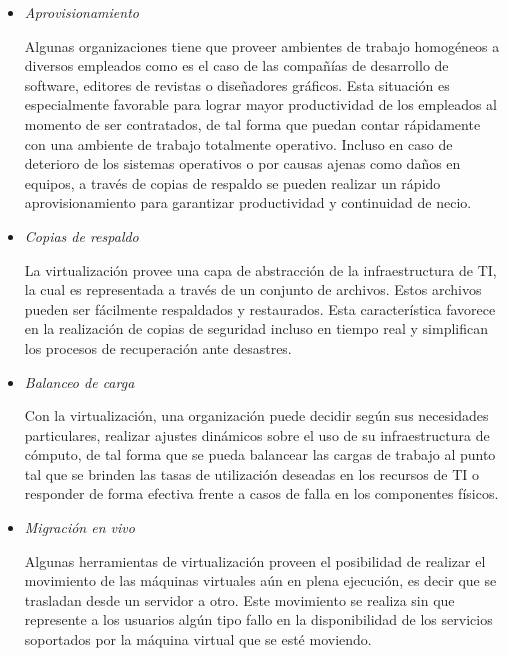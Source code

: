 \begin{itemize}
\begin{itemize}
		\item \textit{Aprovisionamiento}\vspace{3mm}
		
		Algunas organizaciones tiene que proveer ambientes de trabajo homogéneos a diversos empleados como es el caso de las compañías de desarrollo de software, editores de revistas o diseñadores gráficos. Esta situación es especialmente favorable para lograr mayor productividad de los empleados al momento de ser contratados, de tal forma que puedan contar rápidamente con una ambiente de trabajo totalmente operativo. Incluso en caso de deterioro de los sistemas operativos o por causas ajenas como daños en equipos, a través de copias de respaldo se pueden realizar un rápido aprovisionamiento para garantizar productividad y continuidad de necio.\\  
		
		\item \textit{Copias de respaldo}\vspace{3mm}
		
		La virtualización provee una capa de abstracción de la infraestructura de TI, la cual es representada a través de un conjunto de  archivos. Estos archivos pueden ser fácilmente respaldados y restaurados. Esta característica favorece en la realización de copias de seguridad incluso en tiempo real y simplifican los procesos de recuperación ante desastres.\\
		
		\item \textit{Balanceo de carga}\vspace{3mm}
		
		Con la virtualización, una organización puede decidir según sus necesidades particulares, realizar ajustes dinámicos sobre el uso de su infraestructura de cómputo, de tal forma que se pueda balancear las cargas de trabajo al punto tal que se brinden las tasas de utilización deseadas en los recursos de TI o responder de forma efectiva frente a casos de falla en los componentes físicos.\\
		
		\item \textit{Migración en vivo}\vspace{3mm}
		
		Algunas herramientas de virtualización proveen el posibilidad de realizar el movimiento de las máquinas virtuales aún en plena ejecución, es decir que se trasladan desde un servidor a otro. Este movimiento se realiza sin que represente a los usuarios algún tipo fallo en la disponibilidad de los servicios soportados por la máquina virtual que se esté moviendo. \\
				

\end{itemize}
\end{itemize}
